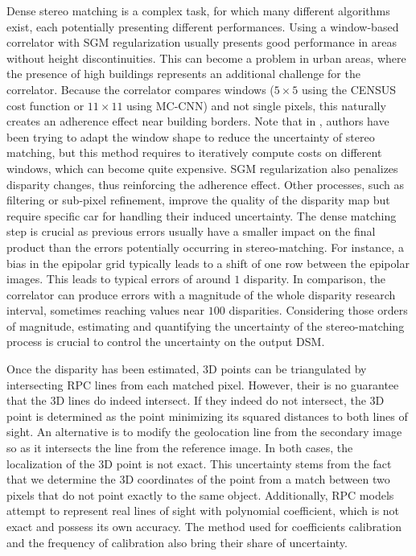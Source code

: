 Dense stereo matching is a complex task, for which many different algorithms exist, each potentially presenting different performances. Using a window-based correlator with SGM regularization usually presents good performance in areas without height discontinuities. This can become a problem in urban areas, where the presence of high buildings represents an additional challenge for the correlator. Because the correlator compares windows ($5\times5$ using the CENSUS cost function or $11\times11$ using MC-CNN) and not single pixels, this naturally creates an adherence effect near building borders. Note that in \cite{okutomi_stereo_1994}, authors have been trying to adapt the window shape to reduce the uncertainty of stereo matching, but this method requires to iteratively compute costs on different windows, which can become quite expensive. SGM regularization also penalizes disparity changes, thus reinforcing the adherence effect. Other processes, such as filtering or sub-pixel refinement, improve the quality of the disparity map but require specific car for handling their induced uncertainty. The dense matching step is crucial as previous errors usually have a smaller impact on the final product than the errors potentially occurring in stereo-matching. For instance, a bias in the epipolar grid typically leads to a shift of one row between the epipolar images. This leads to typical errors of around $1$ disparity. In comparison, the correlator can produce errors with a magnitude of the whole disparity research interval, sometimes reaching values near $100$ disparities. Considering those orders of magnitude, estimating and quantifying the uncertainty of the stereo-matching process is crucial to control the uncertainty on the output DSM. 

Once the disparity has been estimated, 3D points can be triangulated by intersecting RPC lines from each matched pixel. However, their is no guarantee that the 3D lines do indeed intersect. If they indeed do not intersect, the 3D point is determined as the point minimizing its squared distances to both lines of sight. An alternative is to modify the geolocation line from the secondary image so as it intersects the line from the reference image. In both cases, the localization of the 3D point is not exact. This uncertainty stems from the fact that we determine the 3D coordinates of the point from a match between two pixels that do not point exactly to the same object. Additionally, RPC models attempt to represent real lines of sight with polynomial coefficient, which is not exact and possess its own accuracy. The method used for coefficients calibration and the frequency of calibration also bring their share of uncertainty.

